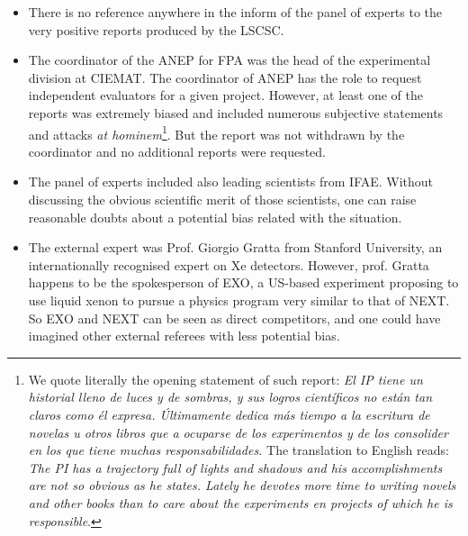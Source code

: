 \begin{itemize}
\item There is no reference anywhere in the inform of the panel of experts to the very positive reports produced by the LSCSC.
\item The coordinator of the ANEP for FPA was the head of the experimental division at CIEMAT. The coordinator of ANEP has the role to request independent evaluators for a given project. However, at least one of the reports was extremely biased and included numerous subjective statements and attacks {\em at hominem}\footnote{We quote literally the opening statement of such report: {\em El IP tiene un historial lleno de luces y de sombras, y sus logros cient\'ificos no est\'an tan claros como \'el expresa. \'Ultimamente dedica m\'as tiempo a la escritura de novelas u otros libros que a ocuparse de los experimentos y de los consolider en los que tiene muchas responsabilidades.} The translation to English reads: {\em The PI has a trajectory full of lights and shadows and his accomplishments are not so obvious as he states. Lately he devotes more time to writing novels and other books than to care about the experiments en projects of which he is responsible}.}. But the report was not withdrawn by the coordinator and no additional reports were requested.
\item The panel of experts included also leading scientists from IFAE. Without discussing the obvious scientific merit of those scientists, one can raise reasonable doubts about a potential bias related with the situation. 
\item The external expert was Prof. Giorgio Gratta from Stanford University,
an internationally recognised expert on Xe detectors. However, prof. Gratta
happens to be  the spokesperson  of EXO, a US-based experiment proposing to use liquid xenon to pursue a physics program very similar to that of NEXT.  So EXO and NEXT can be seen as direct competitors, and one could have imagined other external referees with  less potential bias.  
\end{itemize}
 
